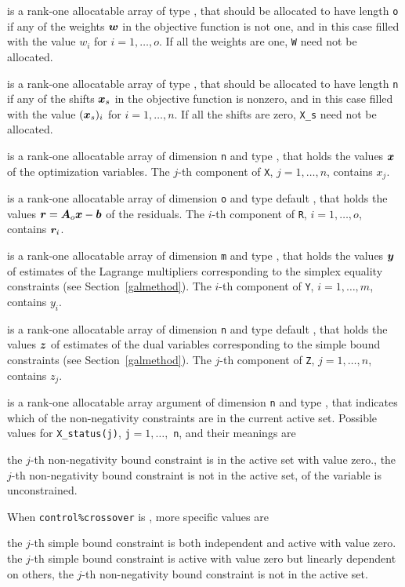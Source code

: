\documentclass{galahad}
\begin{document}
\begin{description}
 is a rank-one allocatable array of type \realdp, that should
be allocated to have length {\tt o} if any of the weights ${\bm{w}}$
in the objective function is not one, and in this case
filled with the value $w_{i}$ for $i = 1, \ldots , o$.
If all the weights are one, {\tt W} need not be allocated.

 is a rank-one allocatable array of type \realdp, that should
be allocated to have length {\tt n} if any of the shifts ${\bm{x}}_s$
in the objective function is nonzero, and in this case
filled with the value $({\bm{x}}_s)_{i}$ for $i = 1, \ldots , n$.
If all the shifts are zero, {\tt X\_s} need not be allocated.

 is a rank-one allocatable array of dimension {\tt n} and type
\realdp,
that holds the values ${\bm{x}}$ of the optimization variables.
The $j$-th component of {\tt X}, $j = 1,  \ldots , n$, contains $x_{j}$.

 is a rank-one allocatable array of dimension {\tt o} and type default
\realdp, that holds the values ${\bm{r}} = {\bm{A}}_o {\bm{x}} - {\bm{b}}$ of the residuals.
The $i$-th component of {\tt R}, $i = 1,  \ldots , o$, contains ${\bm{r}}_{i}$.

 is a rank-one allocatable array of dimension {\tt m} and type
\realdp, that holds
the values ${\bm{y}}$ of estimates  of the Lagrange multipliers
corresponding to the simplex equality constraints (see Section~\ref{galmethod}).
The $i$-th component of {\tt Y}, $i = 1,  \ldots ,  m$, contains $y_{i}$.

 is a rank-one allocatable array of dimension {\tt n} and type default
\realdp, that holds the values ${\bm{z}}$ of estimates  of the dual variables
corresponding to the simple bound constraints (see Section~\ref{galmethod}).
The $j$-th component of {\tt Z}, $j = 1,  \ldots ,  n$, contains $z_{j}$.

 is a rank-one allocatable array argument of dimension {\tt n}
and type \integer, that indicates which of the non-negativity
constraints are in the current active set. Possible values for
{\tt X\_status(j)}, {\tt j}$=1, \ldots ,$ {\tt n}, and their meanings are
\begin{description}
 the $j$-th non-negativity bound constraint
is in the active set with value zero.,
  the $j$-th non-negativity bound constraint is not in the active set,
of the variable is unconstrained.
\end{description}
When {\tt control\%crossover} is \true, more specific values are
\begin{description}
 the $j$-th simple bound constraint
is both independent and active with value zero.
 the $j$-th simple bound constraint
is active with value zero but linearly dependent on others,
 the $j$-th non-negativity bound constraint is not in the active set.
\end{description}

\end{description}
\end{document}
